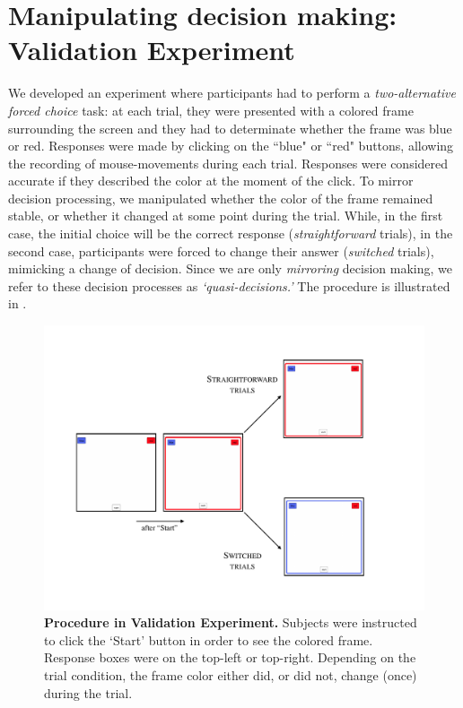 \documentclass{article}
\begin{document}
\section{Manipulating decision making: Validation Experiment}
\label{section:validation}

We developed an experiment where participants had to perform a \emph{two-alternative forced choice} task: at each trial, they were presented with a colored frame surrounding the screen and they had to determinate whether the frame was blue or red. 
Responses were made by clicking on the ``blue" or ``red" buttons, allowing the recording of mouse-movements during each trial. Responses were considered accurate if they described the color at the moment of the click. 
To mirror decision processing, we manipulated whether the color of the frame remained stable, or whether it changed at some point during the trial. 
While, in the first case, the initial choice will be the correct response (\textit{straightforward} trials), in the second case, participants were forced to change their answer (\textit{switched} trials), mimicking a change of decision. Since we are only \emph{mirroring} decision making, we refer to these decision processes as \emph{`quasi-decisions.'}   
The procedure is illustrated in . 


\begin{figure}[h]
\centering
\includegraphics[scale=.5]{procedure.pdf}
\caption{\textbf{Procedure in Validation Experiment.} Subjects were instructed to click the `Start' button in order to see the colored frame. Response boxes were on the top-left or top-right. Depending on the trial condition, the frame color either did, or did not, change (once) during the trial.} \label{fig:procedure.example}
\end{figure}
\end{document}

